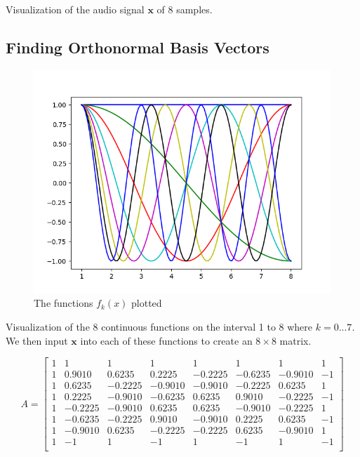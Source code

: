 \documentclass{article}
\newcommand{\bs}[1]{\boldsymbol{#1}}
\begin{document}
Visualization of the audio signal $\bs{x}$ of 8 samples.

\subsection{Finding Orthonormal Basis Vectors}

\begin{figure}[h!]
	\centering
	\includegraphics[scale=0.5]{CA_01Figure_2.png}
	\caption{The functions $f_k(x)$ plotted}
	\label{fig: FIG 02}
\end{figure}

Visualization of the 8 continuous functions on the interval 1 to 8 where $k = 0...7$. We then input $\bs{x}$ into each of these functions to create an $8 \times 8$ matrix. 

$$ A = \begin{bmatrix}
	1 & 1 & 1 & 1 & 1 & 1 & 1 & 1 \\
	1 & 0.9010 & 0.6235 & 0.2225 & -0.2225 & -0.6235 & -0.9010 & -1 \\
	1 & 0.6235 & -0.2225 & -0.9010 & -0.9010 & -0.2225 & 0.6235 & 1 \\
	1 & 0.2225 & -0.9010 & -0.6235 & 0.6235 & 0.9010 & -0.2225 & -1 \\
	1 & -0.2225 & -0.9010 & 0.6235 & 0.6235 & -0.9010 & -0.2225 & 1 \\
	1 & -0.6235 & -0.2225 & 0.9010 & -0.9010 & 0.2225 & 0.6235 & -1 \\
	1 & -0.9010 & 0.6235 & -0.2225 & -0.2225 & 0.6235 & -0.9010 & 1 \\
	1 & -1 & 1 & -1 & 1 & -1 & 1 & -1 \\
	\end{bmatrix} $$
\end{document}
